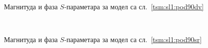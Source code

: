 \begin{figure}[!t]
\centering
{}\\
\caption{Магнитуда и фаза $S$-параметара за модел са сл.~\ref{tsm:sl1:pod90dv}}
\label{tsm:rez:pod90dv}
\end{figure}
\begin{figure}[!t]
\centering
{}\\
\caption{Магнитуда и фаза $S$-параметара за модел са сл.~\ref{tsm:sl1:pod90sr}}
\label{tsm:rez:pod90sr}
\end{figure}

